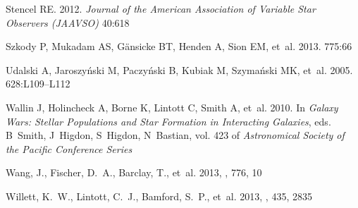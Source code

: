 \documentclass{ar2e}
\begin{document}
\begin{thebibliography}{}
{Stencel} RE. 2012.
\newblock \textit{Journal of the American Association of Variable Star
  Observers (JAAVSO)} 40:618

{Szkody} P, {Mukadam} AS, {G{\"a}nsicke} BT, {Henden} A, {Sion} EM, et~al.
  2013.
\newblock \textit{\apj} 775:66

{Udalski} A, {Jaroszy{\'n}ski} M, {Paczy{\'n}ski} B, {Kubiak} M,
  {Szyma{\'n}ski} MK, et~al. 2005.
\newblock \textit{\apjl} 628:L109--L112

{Wallin} J, {Holincheck} A, {Borne} K, {Lintott} C, {Smith} A, et~al. 2010.
\newblock In \textit{Galaxy Wars: Stellar Populations and Star Formation in
  Interacting Galaxies}, eds. B~{Smith}, J~{Higdon}, S~{Higdon}, N~{Bastian},
  vol. 423 of \textit{Astronomical Society of the Pacific Conference Series}

{Wang}, J., {Fischer}, D.~A., {Barclay}, T., {et~al.} 2013, \apj, 776, 10

{Willett}, K.~W., {Lintott}, C.~J., {Bamford}, S.~P., {et~al.} 2013, \mnras,
  435, 2835

\end{thebibliography}



\end{document}
